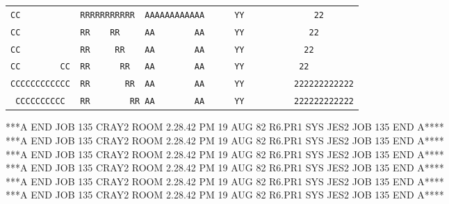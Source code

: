{\begin{tabular}{l}
\texttt{CC\ \ \ \ \ \ \ \ \ \ \ \ RRRRRRRRRRR\ \ AAAAAAAAAAAA\ \ \ \ \ \ YY\ \ \ \ \ \ \ \ \ \ \ \ \ \ 22}\\
\texttt{CC\ \ \ \ \ \ \ \ \ \ \ \ RR\ \ \ \ RR\ \ \ \ \ AA\ \ \ \ \ \ \ \ AA\ \ \ \ \ \ YY\ \ \ \ \ \ \ \ \ \ \ \ \ 22}\\
\texttt{CC\ \ \ \ \ \ \ \ \ \ \ \ RR\ \ \ \ \ RR\ \ \ \ AA\ \ \ \ \ \ \ \ AA\ \ \ \ \ \ YY\ \ \ \ \ \ \ \ \ \ \ \ 22}\\
\texttt{CC\ \ \ \ \ \ \ \ CC\ \ RR\ \ \ \ \ \ RR\ \ \ AA\ \ \ \ \ \ \ \ AA\ \ \ \ \ \ YY\ \ \ \ \ \ \ \ \ \ \ 22}\\
\texttt{CCCCCCCCCCCC\ \ RR\ \ \ \ \ \ \ RR\ \ AA\ \ \ \ \ \ \ \ AA\ \ \ \ \ \ YY\ \ \ \ \ \ \ \ \ \ 222222222222}\\
\texttt{\ CCCCCCCCCC\ \ \ RR\ \ \ \ \ \ \ \ RR\ AA\ \ \ \ \ \ \ \ AA\ \ \ \ \ \ YY\ \ \ \ \ \ \ \ \ \ 222222222222}\\
\end{tabular}}
{\ttfamily ****A END JOB 135 CRAY2 ROOM 2.28.42 PM 19 AUG 82 R6.PR1 SYS JES2 JOB 135 END A****}\\
{\ttfamily ****A END JOB 135 CRAY2 ROOM 2.28.42 PM 19 AUG 82 R6.PR1 SYS JES2 JOB 135 END A****}\\
{\ttfamily ****A END JOB 135 CRAY2 ROOM 2.28.42 PM 19 AUG 82 R6.PR1 SYS JES2 JOB 135 END A****}\\
{\ttfamily ****A END JOB 135 CRAY2 ROOM 2.28.42 PM 19 AUG 82 R6.PR1 SYS JES2 JOB 135 END A****}\\
{\ttfamily ****A END JOB 135 CRAY2 ROOM 2.28.42 PM 19 AUG 82 R6.PR1 SYS JES2 JOB 135 END A****}\\
{\ttfamily ****A END JOB 135 CRAY2 ROOM 2.28.42 PM 19 AUG 82 R6.PR1 SYS JES2 JOB 135 END A****}\\
